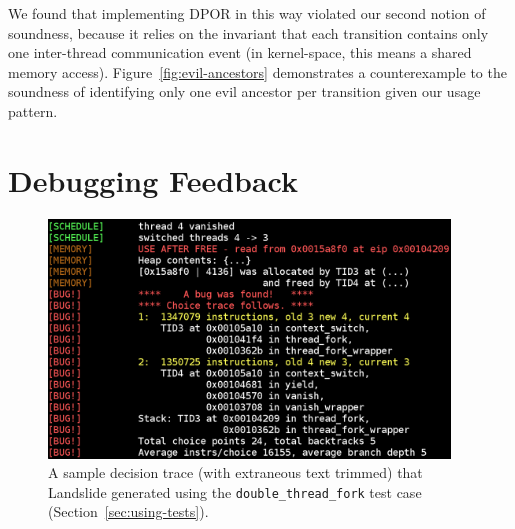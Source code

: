 We found that implementing DPOR in this way violated our second notion of soundness, because it relies on the invariant that each transition contains only one inter-thread communication event (in kernel-space, this means a shared memory access).
 Figure~\ref{fig:evil-ancestors} demonstrates a counterexample to the soundness of identifying only one evil ancestor per transition given our usage pattern.


\section{Debugging Feedback}
\label{sec:techniques-feedback}

\begin{figure}[h]
	\begin{center}
		\includegraphics[width=0.95\textwidth]{found_a_bug.png}
	\end{center}
	\caption{A sample decision trace (with extraneous text trimmed) that Landslide generated using the \texttt{double\_thread\_fork} test case (Section~\ref{sec:using-tests}).}
	\label{fig:found_a_bug}
\end{figure}

